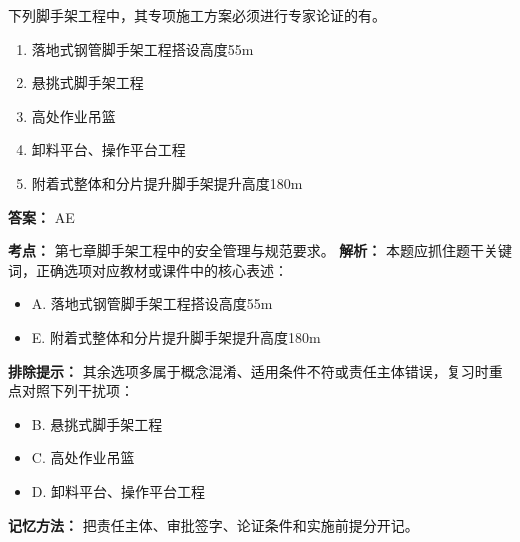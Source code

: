 \documentclass[UTF8,fontset=fandol,11pt]{ctexart}
\begin{document}
\begin{quizbox}[title={第 5 题}]
下列脚手架工程中，其专项施工方案必须进行专家论证的有。\\
\begin{enumerate}[label=\Alph*.]
\item 落地式钢管脚手架工程搭设高度55m
\item 悬挑式脚手架工程
\item 高处作业吊篮
\item 卸料平台、操作平台工程
\item 附着式整体和分片提升脚手架提升高度180m
\end{enumerate}
\textbf{答案：} AE
\vspace{0.25em}
\begin{answerbox}[title={考点解析}]
\textbf{考点：} 第七章脚手架工程中的安全管理与规范要求。
\textbf{解析：} 本题应抓住题干关键词，正确选项对应教材或课件中的核心表述：
\begin{itemize}
\item A. 落地式钢管脚手架工程搭设高度55m
\item E. 附着式整体和分片提升脚手架提升高度180m
\end{itemize}
\textbf{排除提示：} 其余选项多属于概念混淆、适用条件不符或责任主体错误，复习时重点对照下列干扰项：
\begin{itemize}
\item B. 悬挑式脚手架工程
\item C. 高处作业吊篮
\item D. 卸料平台、操作平台工程
\end{itemize}
\textbf{记忆方法：} 把责任主体、审批签字、论证条件和实施前提分开记。
\end{answerbox}
\end{quizbox}
\end{document}

